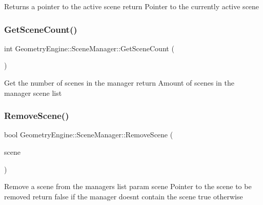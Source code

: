 Returns a pointer to the active scene return Pointer to the currently active scene \mbox{\label{class_geometry_engine_1_1_scene_manager_a1dc46b5707a779a3fcc3881bb7c8f3f6}} 
\subsubsection{\texorpdfstring{GetSceneCount()}{GetSceneCount()}}
{\footnotesize\ttfamily int Geometry\+Engine\+::\+Scene\+Manager\+::\+Get\+Scene\+Count (\begin{DoxyParamCaption}{ }\end{DoxyParamCaption})\hspace{0.3cm}{\ttfamily [inline]}}

Get the number of scenes in the manager return Amount of scenes in the manager scene list \mbox{\label{class_geometry_engine_1_1_scene_manager_a31890e580c47aceaeab795e8886bcf82}} 
\subsubsection{\texorpdfstring{RemoveScene()}{RemoveScene()}\hspace{0.1cm}{\footnotesize\ttfamily [1/2]}}
{\footnotesize\ttfamily bool Geometry\+Engine\+::\+Scene\+Manager\+::\+Remove\+Scene (\begin{DoxyParamCaption}\item[{\mbox{\hyperlink{class_geometry_engine_1_1_geometry_scene_1_1_geometry_scene}{Geometry\+Scene\+::\+Geometry\+Scene}} $\ast$}]{scene }\end{DoxyParamCaption})}

Remove a scene from the manager\textquotesingle{}s list param scene Pointer to the scene to be removed return false if the manager doesn\textquotesingle{}t contain the scene true otherwise \mbox{\label{class_geometry_engine_1_1_scene_manager_ad8ca79bfce997398df387dd42d6e4312}} 
